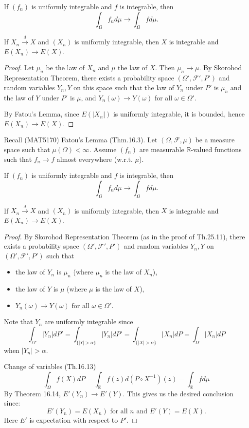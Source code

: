 If \((f_n)\) is uniformly integrable and \(f\) is integrable, then
\[
\int_{\Omega} f_n d\mu \to \int_{\Omega} f d\mu.
\]

\begin{theorem}[15.12]
If \(X_n \xrightarrow{d} X\) and \((X_n)\) is uniformly integrable, then \(X\) is integrable and \(E(X_n) \to E(X)\).
\end{theorem}

\begin{proof}
Let \(\mu_n\) be the law of \(X_n\) and \(\mu\) the law of \(X\). Then \(\mu_n \to \mu\). By Skorohod Representation Theorem, there exists a probability space \((\Omega', \mathcal{F}', P')\) and random variables \(Y_n, Y\) on this space such that the law of \(Y_n\) under \(P'\) is \(\mu_n\) and the law of \(Y\) under \(P'\) is \(\mu\), and \(Y_n(\omega) \to Y(\omega)\) for all \(\omega \in \Omega'\).

By Fatou's Lemma, since \(E(|X_n|)\) is uniformly integrable, it is bounded, hence \(E(X_n) \to E(X)\).
\end{proof}

Recall (MAT5170) Fatou's Lemma (Thm.16.3). Let \((\Omega, \mathcal{F}, \mu)\) be a measure space such that \(\mu(\Omega) < \infty\). Assume \((f_n)\) are measurable \(\mathbb{R}\)-valued functions such that \(f_n \to f\) almost everywhere (w.r.t. \(\mu\)).

If \((f_n)\) is uniformly integrable and \(f\) is integrable, then
\[
\int_{\Omega} f_n d\mu \to \int_{\Omega} f d\mu.
\]

\begin{theorem}[15.12]
If \(X_n \xrightarrow{d} X\) and \((X_n)\) is uniformly integrable, then \(X\) is integrable and \(E(X_n) \to E(X)\).
\end{theorem}

\begin{proof}
By Skorohod Representation Theorem (as in the proof of Th.25.11), there exists a probability space \((\Omega', \mathcal{F}', P')\) and random variables \(Y_n, Y\) on \((\Omega', \mathcal{F}', P')\) such that
\begin{itemize}
    \item the law of \(Y_n\) is \(\mu_n\) (where \(\mu_n\) is the law of \(X_n\)),
    \item the law of \(Y\) is \(\mu\) (where \(\mu\) is the law of \(X\)),
    \item \(Y_n(\omega) \rightarrow Y(\omega)\) for all \(\omega \in \Omega'\).
\end{itemize}
Note that \(Y_n\) are uniformly integrable since
\[
    \int_{\Omega'} |Y_n| dP' = \int_{\{|Y| > \alpha\}} |Y_n| dP' = \int_{\{|X| > \alpha\}} |X_n| dP = \int_{\Omega} |X_n| dP
\]
when \(|Y_n| > \alpha\).

Change of variables (Th.16.13)
\[
    \int_{\Omega} f(X) dP = \int_{\mathbb{R}} f(z) d(P \circ X^{-1})(z) = \int_{\mathbb{R}} f d\mu
\]
By Theorem 16.14, \(E'(Y_n) \rightarrow E'(Y)\).
This gives us the desired conclusion since:
\[
    E'(Y_n) = E(X_n) \text{ for all } n \text{ and } E'(Y) = E(X).
\]
Here \(E'\) is expectation with respect to \(P'\).
\end{proof}


